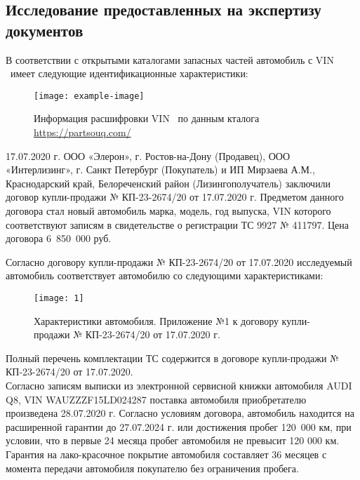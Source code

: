 \subsection{Исследование предоставленных на экспертизу документов}
%

В соответствии с открытыми каталогами запасных частей  автомобиль с VIN \vin \ имеет следующие идентификационные характеристики:

\begin{figure}[H]
	\centering
	\texttt{[image: example-image]}
	\caption{Информация расшифровки VIN \vin \ по данным кталога \url{https://partsouq.com/}}
	\label{vin}
\end{figure}
%
17.07.2020 г. ООО «Элерон», г. Ростов-на-Дону (Продавец), ООО «Интерлизинг», г. Санкт Петербург (Покупатель) и ИП Мирзаева А.М., Краснодарский край, Белореченский район (Лизингополучатель) заключили договор купли-продажи № КП-23-2674/20 от 17.07.2020 г. Предметом данного договора стал новый автомобиль марка, модель, год выпуска, VIN которого соответствуют записям в свидетельстве о регистрации ТС 9927 № 411797. Цена договора 6 850 000 руб.

Согласно договору купли-продажи № КП-23-2674/20 от 17.07.2020 исследуемый автомобиль  соответствует  автомобилю со следующими характеристиками:\\

\begin{figure}[H]
	\centering
	\texttt{[image: 1]}
	\caption{Характеристики автомобиля.  Приложение №1 к договору купли-продажи № КП-23-2674/20 от 17.07.2020 г.}
	\label{vin}
\end{figure}

Полный перечень комплектации ТС содержится в договоре купли-продажи № КП-23-2674/20 от 17.07.2020.\\
Согласно  записям  выписки из электронной сервисной книжки автомобиля AUDI Q8, VIN  WAUZZZF15LD024287 поставка автомобиля приобретателю произведена   28.07.2020 г. Согласно условиям договора, автомобиль находится на расширенной гарантии до 27.07.2024 г. или достижения  пробег 120 000 км, при условии, что в первые 24 месяца пробег автомобиля не превысит 120 000 км. Гарантия на лако-красочное покрытие автомобиля составляет 36 месяцев с момента передачи автомобиля покупателю без ограничения пробега.\\[3mm]

